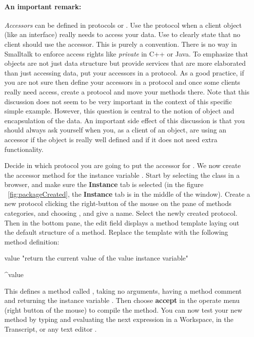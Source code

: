 \paragraph{An important remark:} \textit{Accessors} can be defined in protocols
 or .  Use the
 protocol when a client object (like an
interface) really needs to access your data. Use 
to clearly state that no client should use the accessor. This is
purely a convention. There is no way in Smalltalk to enforce
access rights like \emph{private} in C++ or Java.  To emphasize that objects are
not just data structure but provide services that are more
elaborated than just accessing data, put your accessors  in a
 protocol. As a good practice, if you are not sure
then define your accessors in a  protocol and
once some clients really need access, create
a protocol  and move your methods there. Note
that this discussion does not seem to be very important in the
context of this specific simple example. However, this question is
central to the notion of object and encapsulation of the data. An
important side effect of this discussion is that you should always
ask yourself when you, as a client of an object, are using an
accessor if the object is really well defined and if it does not
need extra functionality.

\exercise Decide in which protocol you are going to put the
accessor for . We now create the accessor method for the
instance variable . Start by selecting the class
 in a browser, and make sure the \textbf{Instance}
tab is selected (in the figure ~\ref{fig:packageCreated}, the
\textbf{Instance} tab is in the middle of the window). Create a
new protocol clicking the right-button of the mouse on the pane of
methods categories, and choosing , and give a name. Select
the newly created protocol. Then in the bottom pane, the edit
field displays a method template laying out the default structure
of a method. Replace the template with the following method
definition:

\begin{code}
value
  "return the current value of the value instance variable"

  ^value

\end{code}

This defines a method called , taking no
arguments, having a method comment and returning the instance
variable . Then choose \textbf{accept} in the
operate menu (right button of the mouse) to compile the method. You
can now test your new method by typing and evaluating the next
expression in a Workspace, in the Transcript, or any text editor .

